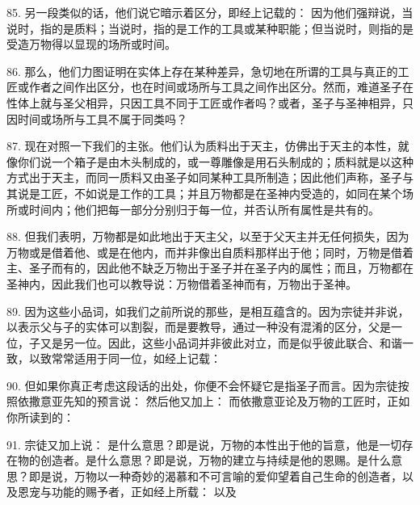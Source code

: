 85. 另一段类似的话，他们说它暗示着区分，即经上记载的： 因为他们强辩说，当说时，指的是质料；当说时，指的是工作的工具或某种职能；但当说时，则指的是受造万物得以显现的场所或时间。\par

86. 那么，他们力图证明在实体上存在某种差异，急切地在所谓的工具与真正的工匠或作者之间作出区分，也在时间或场所与工具之间作出区分。然而，难道圣子在性体上就与圣父相异，只因工具不同于工匠或作者吗？或者，圣子与圣神相异，只因时间或场所与工具不属于同类吗？\par

87. 现在对照一下我们的主张。他们认为质料出于天主，仿佛出于天主的本性，就像你们说一个箱子是由木头制成的，或一尊雕像是用石头制成的；质料就是以这种方式出于天主，而同一质料又由圣子如同某种工具所制造；因此他们声称，圣子与其说是工匠，不如说是工作的工具；并且万物都是在圣神内受造的，如同在某个场所或时间内；他们把每一部分分别归于每一位，并否认所有属性是共有的。\par

88. 但我们表明，万物都是如此地出于天主父，以至于父天主并无任何损失，因为万物或是借着他、或是在他内，而并非像出自质料那样出于他；同时，万物是借着主、圣子而有的，因此他不缺乏万物出于圣子并在圣子内的属性；而且，万物都在圣神内，因此我们也可以教导说：万物借着圣神而有，万物出于圣神。\par

89. 因为这些小品词，如我们之前所说的那些，是相互蕴含的。因为宗徒并非说，以表示父与子的实体可以割裂，而是要教导，通过一种没有混淆的区分，父是一位，子又是另一位。因此，这些小品词并非彼此对立，而是似乎彼此联合、和谐一致，以致常常适用于同一位，如经上记载：\par

90. 但如果你真正考虑这段话的出处，你便不会怀疑它是指圣子而言。因为宗徒按照依撒意亚先知的预言说： 然后他又加上： 而依撒意亚论及万物的工匠时，正如你所读到的：\par

91. 宗徒又加上说： 是什么意思？即是说，万物的本性出于他的旨意，他是一切存在物的创造者。是什么意思？即是说，万物的建立与持续是他的恩赐。是什么意思？即是说，万物以一种奇妙的渴慕和不可言喻的爱仰望着自己生命的创造者，以及恩宠与功能的赐予者，正如经上所载： 以及 \par

